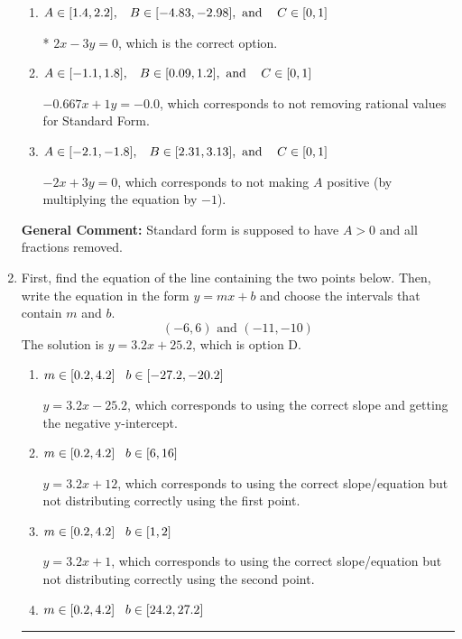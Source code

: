 \documentclass{extbook}[14pt]
\newcommand{\litem}[1]{\item #1

\rule{\textwidth}{0.4pt}}
\begin{document}
\begin{enumerate}
{\begin{enumerate}[label=\Alph*.]
 $-0.667x - 1y = 0.0$, which corresponds to using the opposite (negative) slope of the graph and not removing rational values.
\item \( A \in [1.4, 2.2], \hspace{3mm} B \in [-4.83, -2.98], \text{ and } \hspace{3mm} C \in [0, 1] \)

* $2x - 3y = 0$, which is the correct option.
\item \( A \in [-1.1, 1.8], \hspace{3mm} B \in [0.09, 1.2], \text{ and } \hspace{3mm} C \in [0, 1] \)

 $-0.667x + 1y = -0.0$, which corresponds to not removing rational values for Standard Form.
\item \( A \in [-2.1, -1.8], \hspace{3mm} B \in [2.31, 3.13], \text{ and } \hspace{3mm} C \in [0, 1] \)

 $-2x + 3y = 0$, which corresponds to not making $A$ positive (by multiplying the equation by $-1$).
\end{enumerate}

\textbf{General Comment:} Standard form is supposed to have $A > 0$ and all fractions removed.
}
\litem{
First, find the equation of the line containing the two points below. Then, write the equation in the form $ y=mx+b $ and choose the intervals that contain $m$ and $b$.
\[ (-6, 6) \text{ and } (-11, -10) \]The solution is \( y = 3.2x + 25.2 \), which is option D.\begin{enumerate}[label=\Alph*.]
\item \( m \in [0.2, 4.2] \hspace*{3mm} b \in [-27.2, -20.2] \)

 $y = 3.2x -25.2$, which corresponds to using the correct slope and getting the negative y-intercept.
\item \( m \in [0.2, 4.2] \hspace*{3mm} b \in [6, 16] \)

 $y = 3.2x + 12$, which corresponds to using the correct slope/equation but not distributing correctly using the first point.
\item \( m \in [0.2, 4.2] \hspace*{3mm} b \in [1, 2] \)

 $y = 3.2x + 1$, which corresponds to using the correct slope/equation but not distributing correctly using the second point.
\item \( m \in [0.2, 4.2] \hspace*{3mm} b \in [24.2, 27.2] \)


\end{enumerate}}
\end{enumerate}
\end{document}
